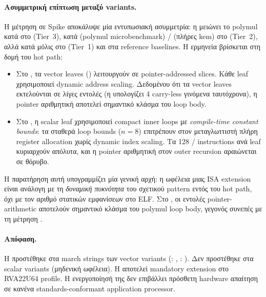 \paragraph{Ασυμμετρική επίπτωση μεταξύ variants.}
Η μέτρηση σε Spike αποκάλυψε μία εντυπωσιακή ασυμμετρία: η 
μειώνει το polymul \instret κατά  στο 
(Tier~3), κατά  (polymul microbenchmark) /  (πλήρες \gls{kem}) στο  (Tier~2), αλλά κατά
μόλις  στο  (Tier~1) και  στα
reference baselines. Η ερμηνεία βρίσκεται στη δομή του hot path:
%
\begin{itemize}
  \item Στο , τα vector leaves ()
        λειτουργούν σε pointer-addressed slices. Κάθε leaf χρησιμοποιεί
        dynamic address scaling. Δεδομένου ότι τα vector leaves εκτελούνται
        σε λίγες εντολές (η \vclmul{} υπολογίζει \num{4} carry-less
        γινόμενα ταυτόχρονα), η pointer αριθμητική αποτελεί σημαντικό
        κλάσμα του loop body.
  \item Στο , η scalar leaf 
        χρησιμοποιεί compact inner loops με \emph{compile-time constant bounds}:
        τα σταθερά loop bounds ($n=8$) επιτρέπουν στον μεταγλωττιστή πλήρη
        register allocation χωρίς dynamic index scaling. Τα \num{128}
        \clmul/\clmulh{} instructions ανά leaf κυριαρχούν απόλυτα, και η
        pointer αριθμητική στον outer recursion αραιώνεται σε θόρυβο.
\end{itemize}
%
Η παρατήρηση αυτή υπογραμμίζει μία γενική αρχή: η ωφέλεια μιας ISA
extension είναι ανάλογη με τη \emph{δυναμική πυκνότητα} του σχετικού
pattern εντός του hot path, όχι με τον αριθμό στατικών εμφανίσεων
στο ELF. Στο , οι εντολές pointer-arithmetic
αποτελούν σημαντικό κλάσμα του polymul loop body, γεγονός συνεπές
με τη μέτρηση .

\paragraph{Απόφαση.}
Η  προστέθηκε στα march strings των vector variants
(: ,
: ). Δεν προστέθηκε στα
scalar variants (μηδενική ωφέλεια). Η  αποτελεί mandatory
extension στο RVA22U64 profile. Η ενεργοποίησή της δεν επιβάλλει
πρόσθετη hardware απαίτηση σε κανένα standards-conformant application
processor.

